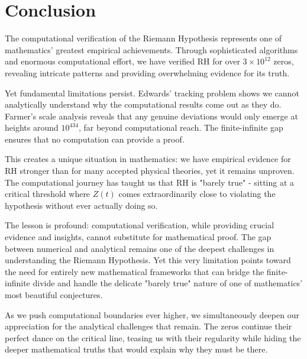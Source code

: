 \section{Conclusion}

The computational verification of the Riemann Hypothesis represents one of mathematics' greatest empirical achievements. Through sophisticated algorithms and enormous computational effort, we have verified RH for over $3 \times 10^{12}$ zeros, revealing intricate patterns and providing overwhelming evidence for its truth.

Yet fundamental limitations persist. Edwards' tracking problem shows we cannot analytically understand why the computational results come out as they do. Farmer's scale analysis reveals that any genuine deviations would only emerge at heights around $10^{434}$, far beyond computational reach. The finite-infinite gap ensures that no computation can provide a proof.

This creates a unique situation in mathematics: we have empirical evidence for RH stronger than for many accepted physical theories, yet it remains unproven. The computational journey has taught us that RH is "barely true" - sitting at a critical threshold where $Z(t)$ comes extraordinarily close to violating the hypothesis without ever actually doing so.

The lesson is profound: computational verification, while providing crucial evidence and insights, cannot substitute for mathematical proof. The gap between numerical and analytical remains one of the deepest challenges in understanding the Riemann Hypothesis. Yet this very limitation points toward the need for entirely new mathematical frameworks that can bridge the finite-infinite divide and handle the delicate "barely true" nature of one of mathematics' most beautiful conjectures.

As we push computational boundaries ever higher, we simultaneously deepen our appreciation for the analytical challenges that remain. The zeros continue their perfect dance on the critical line, teasing us with their regularity while hiding the deeper mathematical truths that would explain why they must be there.